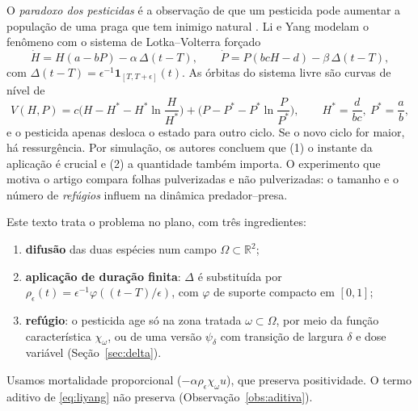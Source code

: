 \documentclass[11pt,a4paper]{article}
\numberwithin{equation}{section}
\theoremstyle{definition}
\theoremstyle{remark}
\newcommand{\R}{\mathbb{R}}
\newcommand{\Hs}{H^{*}}
\newcommand{\Ps}{P^{*}}
\begin{document}
O \emph{paradoxo dos pesticidas} é a observação de que um pesticida pode aumentar a população de
uma praga que tem inimigo natural \cite{Hardin,Lester,Heong}. Li e Yang \cite{LiYang} modelam o
fenômeno com o sistema de Lotka--Volterra forçado
\begin{equation}\label{eq:liyang}
\dot H=H(a-bP)-\alpha\,\Delta(t-T),\qquad \dot P=P(bcH-d)-\beta\,\Delta(t-T),
\end{equation}
com $\Delta(t-T)=\epsilon^{-1}\mathbf 1_{[T,T+\epsilon]}(t)$. As órbitas do sistema livre são curvas
de nível de
\begin{equation}\label{eq:V}
V(H,P)=c\Big(H-\Hs-\Hs\ln\frac{H}{\Hs}\Big)+\Big(P-\Ps-\Ps\ln\frac{P}{\Ps}\Big),\qquad
\Hs=\frac d{bc},\ \Ps=\frac ab,
\end{equation}
e o pesticida apenas desloca o estado para outro ciclo. Se o novo ciclo for maior, há
ressurgência. Por simulação, os autores concluem que (1) o instante da aplicação é crucial e
(2) a quantidade também importa. O experimento que motiva o artigo \cite{Lester} compara
folhas pulverizadas e não pulverizadas: o tamanho e o número de \emph{refúgios} influem na
dinâmica predador--presa.

Este texto trata o problema no plano, com três ingredientes:
\begin{enumerate}
\item \textbf{difusão} das duas espécies num campo $\Omega\subset\R^2$;
\item \textbf{aplicação de duração finita}: $\Delta$ é substituída por
$\rho_\epsilon(t)=\epsilon^{-1}\varphi((t-T)/\epsilon)$, com $\varphi$ de suporte compacto em $[0,1]$;
\item \textbf{refúgio}: o pesticida age só na zona tratada $\omega\subset\Omega$, por meio da
função característica $\chi_\omega$, ou de uma versão $\psi_\delta$ com transição de largura $\delta$ e
dose variável (Seção~\ref{sec:delta}).
\end{enumerate}
Usamos mortalidade proporcional ($-\alpha\rho_\epsilon\chi_\omega u$), que preserva positividade.
O termo aditivo de \eqref{eq:liyang} não preserva (Observação~\ref{obs:aditiva}).
\end{document}
